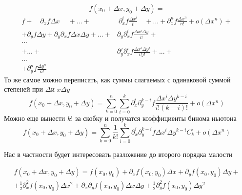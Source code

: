 \documentclass[a4paper,12pt]{article}
\renewcommand{\d}[2][ ]{%
\partial^{#1}_{#2}}
\begin{document}
    \[ f(x_0 + \Delta x, y_0 + \Delta y) = \]
\begin{equation*}
    \begin{split}
            f + \quad \d{x}f \Delta x \quad \  + ... + &\ \d[i]{x}f\frac{\Delta x^i}{i!} \quad +... + \d[n]{x}f\frac{ \Delta x^n}{n!} + o(\Delta x^n) + \\
            +\d{y}f\Delta y +\d{y}\d{x}f \Delta x\Delta y + ... +& \d{y}\d[i]{x}f\frac{\Delta x^i \Delta y}{i!} +\\
            ... \quad\\
                + ... +& \d[j]{y}\d[i]{x}f\frac{\Delta x^i \Delta y^j}{i!j!} + ... +      \\
            ... \\
            +\d[n]{y}f\frac{\Delta y^n}{n!} \qquad\qquad\qquad\qquad\quad &
    \end{split}
\end{equation*}
То же самое можно переписать, как суммы слагаемых с одинаковой суммой степеней при $\Delta $и $x\Delta y$
\begin{equation*}
    f(x_0 + \Delta x, y_0 + \Delta y) =
    \sum_{k=0}^n \sum_{i=0}^k \d[i]{x}\d[k-i]{y}f\frac{\Delta x^i \Delta y^{k-i}}{i!(k-i)!} + o(\Delta x^n)  
\end{equation*}
Можно еще вынести $k!$ за скобку и получатся коэффициенты бинома ньютона
\begin{equation*}
    f(x_0 + \Delta x, y_0 + \Delta y) =
    \sum_{k=0}^n \frac{1}{k!}\sum_{i=0}^k \d[i]{x}\d[k-i]{y}f\Delta x^i \Delta y^{k-i}C_k^i + o(\Delta x^n)  
\end{equation*}

Нас в частности будет интересовать разложение до второго порядка малости

\begin{equation*}
    \begin{split}
        f(x_0 + \Delta x, y_0 + \Delta y) =
        f(x_0, y_0) + \d{x}f(x_0, y_0)\Delta x + \d{y}f(x_0, y_0)\Delta y + \\
        + \frac{1}{2}\d[2]{x}f(x_0, y_0)\Delta x^2 + \d{x}\d{y}f(x_0, y_0)\Delta x \Delta y + \frac{1}{2}\d[2]{y}f(x_0, y_0)\Delta y^2
    \end{split}
\end{equation*}
\end{document}

